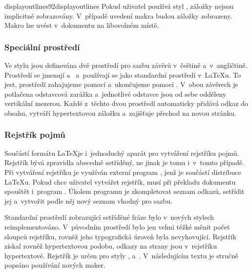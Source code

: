 \documentclass[12pt]{article}
\begin{document}
\begin{example}
\end{example}
\par\egroup

\medskip
\begin{makro}{displayoutlines}{\char92displayoutlines}
  Pokud uživatel používá styl , záložky nejsou implicitně
  zobrazovány. V~případě uvedení makra  budou záložky
  zobrazeny. Makro lze uvést v~dokumentu na libovolném místě.
\end{makro}

\subsubsection*{Speciální prostředí}
Ve stylu  jsou definována dvě prostředí pro sazbu závěrů
v~češtině a~v~angličtině. Prostředí se jmenují
a~
a~používají se jako standardní prostředí v~\LaTeX u.
To jest, prostředí zahajujeme pomocí
a~ukončujeme pomocí
.
V~obou závěrech je potlačena odstavcová zarážka a~jednotlivé odstavce
jsou od sebe odděleny vertikální mezerou. Každé z~těchto dvou prostředí
automaticky přidává odkaz do obsahu, vytváří hypertextovou záložku
a~zajišťuje přechod na novou stránku.

\subsubsection*{Rejstřík pojmů}
Součástí formátu \LaTeX je i~jednoduchý aparát pro vytváření rejstříku pojmů.
Rejstřík bývá zpravidla abecedně setříděný, ne jinak je tomu i~v~tomto případě.
Při vytváření rejstříku je využíván externí program , jenž je
součástí distribuce \LaTeX u. Pokud chce uživatel vytvářet rejstřík, musí
při překladu dokumentu spouštět i~program . Úkolem programu
 je zkompletovat seznam odkazů, setřídit jej a~vytvořit podle
něj nový seznam vhodný pro sazbu.

\medskip
Standardní prostředí  zobrazující setříděné fráze bylo v~nových
stylech reimplementováno. V~původním prostředí  bylo jen velmi
těžké měnit počet sloupců rejstříku, rovněž jeho typografická úroveň byla
nevyhovující. Rejstřík získal rovněž hypertextovou podobu, odkazy na strany
jsou v~rejstříku hypertextové. Rejstřík je určen pro styly
,  a~.
V~následujícím textu je stručně popsáno používání nových maker.
\end{document}
